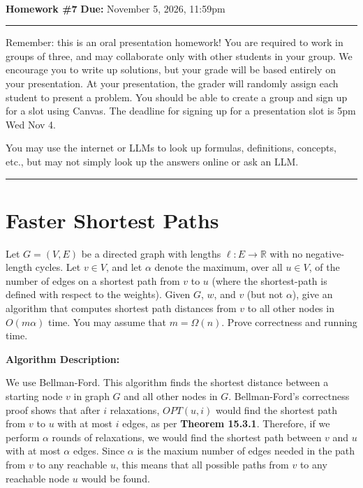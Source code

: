 \documentclass[11pt]{article}
\newcommand{\R}{\ensuremath{\mathbb R}}
\begin{document}
\\ 
{{\bf Homework \#7}} \hfill {{\bf Due:} November 5, 2026, 11:59pm} \\
\rule[0.1in]{\textwidth}{0.4pt}

Remember: this is an oral presentation homework! You are required to work in groups of three, and may collaborate only with other students in your group. 
We encourage you to write up solutions, but your grade will be based entirely on your presentation. 
At your presentation, the grader will randomly assign each student to present a problem. 
You should be able to create a group and sign up for a slot using Canvas.  The deadline for signing up for a presentation slot is 5pm Wed Nov 4.

You may use the internet or LLMs to look up formulas, definitions, concepts, etc., but may not simply look up the answers online or ask an LLM.  

\noindent \rule[0.1in]{\textwidth}{0.4pt}

\section{Faster Shortest Paths}

Let $G = (V, E)$ be a directed graph with lengths $\ell : E \rightarrow \R$ with no negative-length cycles. 
Let $v \in V$, and let $\alpha$ denote the maximum, over all $u \in V$, of the number of edges on a shortest path from $v$ to $u$ 
(where the shortest-path is defined with respect to the weights).  Given $G$, $w$, and $v$ (but not $\alpha$), 
give an algorithm that computes shortest path distances from $v$ to all other nodes in $O(m \alpha)$ time.  You may assume that $m = \Omega(n)$. 
Prove correctness and running time.

\bigbreak

\textbf{Algorithm Description:}

We use Bellman-Ford. This algorithm finds the shortest distance between a starting node $v$ in graph $G$ and all other nodes in $G$. 
Bellman-Ford's correctness proof shows that after $i$ relaxations, $OPT(u, i)$ would find the shortest path from $v$ to $u$ with at most $i$ edges, 
as per \textbf{Theorem 15.3.1}. Therefore, if we perform $\alpha$ rounds of relaxations, we would find the shortest path between $v$ and $u$ 
with at most $\alpha$ edges. Since $\alpha$ is the maxium number of edges needed in the path from $v$ to any reachable $u$, 
this means that all possible paths from $v$ to any reachable node $u$ would be found.
\end{document}
